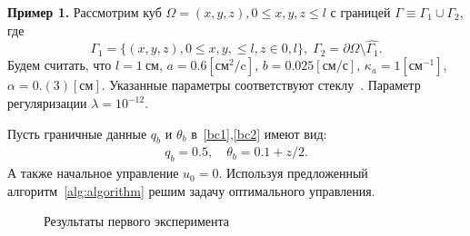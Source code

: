 \documentclass[12pt]{article}
\begin{document}
    \textbf{Пример 1.}
    Рассмотрим куб $\Omega = {(x, y, z), 0 \leq x,y,z \leq l}$ с границей $\Gamma \equiv \Gamma_1 \cup \Gamma_2$, где
    \[
        \Gamma_1 = \{(x, y, z), 0 \leq x,y, \leq l, z \in 0, l\}, \;
        \Gamma_2 = \partial \Omega \setminus \hat{\Gamma_1}.
    \]
    Будем считать, что
    $l=1~\text{см}$,
    $a = 0.6[\text{см}^2/\text{c}]$,
    $b=0.025[\text{см}/\text{с}]$,
    $\kappa_a=1[\text{см}^{-1}]$,
    $\alpha = 0.(3)[\text{см}]$.
    Указанные параметры соответствуют стеклу~\cite{Grenkin5}.
    Параметр регуляризации $\lambda=10^{-12}$.

    Пусть граничные данные $q_b$ и $\theta_b$ в~\eqref{bc1},\eqref{bc2} имеют вид:
    \begin{gather*}
        q_b = 0.5, \quad
        \theta_b = 0.1 + z/2.
    \end{gather*}
    А также начальное управление $u_0 = 0$.
    Используя предложенный алгоритм~\ref{alg:algorithm} решим задачу оптимального управления.

    \begin{figure}[H]
        \centering
        \caption{Результаты первого эксперимента}
        \label{fig:1}
    \end{figure}
\end{document}
